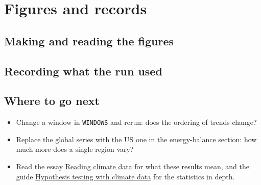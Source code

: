 \chapter{Figures and records}\label{ch:figures}
\section{Making and reading the figures}

\section{Recording what the run used}


\section{Where to go next}
\begin{itemize}
\item Change a window in \texttt{WINDOWS} and rerun: does the ordering of trends change?
\item Replace the global series with the US one in the energy-balance section: how much more does a single region vary?
\item Read the essay \href{https://ahmadammar.github.io/writing/climate-data/}{Reading climate data} for what these results mean, and the guide \href{https://ahmadammar.github.io/teaching/hypothesis-testing/}{Hypothesis testing with climate data} for the statistics in depth.
\end{itemize}
